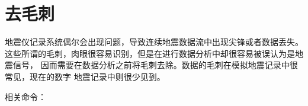 \section{去毛刺}
地震仪记录系统偶尔会出现问题，导致连续地震数据流中出现尖锋或者数据丢失。
这些所谓的毛刺，肉眼很容易识别，但是在进行数据分析中却很容易被误认为是地震信号，
因而需要在数据分析之前将毛刺去除。数据的毛刺在模拟地震记录中很常见，现在的数字
地震记录中则很少见到。

相关命令：
